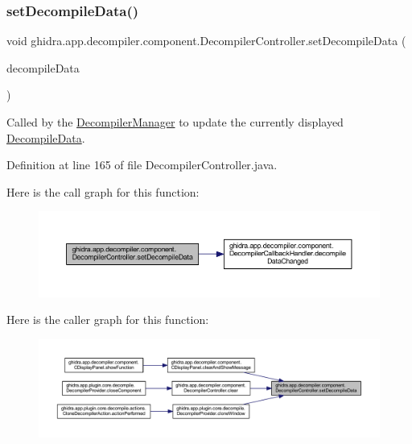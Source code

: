 \subsubsection{\texorpdfstring{setDecompileData()}{setDecompileData()}}
{\footnotesize\ttfamily void ghidra.\+app.\+decompiler.\+component.\+Decompiler\+Controller.\+set\+Decompile\+Data (\begin{DoxyParamCaption}\item[{\mbox{\hyperlink{classghidra_1_1app_1_1decompiler_1_1component_1_1_decompile_data}{Decompile\+Data}}}]{decompile\+Data }\end{DoxyParamCaption})\hspace{0.3cm}{\ttfamily [inline]}}

Called by the \mbox{\hyperlink{classghidra_1_1app_1_1decompiler_1_1component_1_1_decompiler_manager}{Decompiler\+Manager}} to update the currently displayed \mbox{\hyperlink{classghidra_1_1app_1_1decompiler_1_1component_1_1_decompile_data}{Decompile\+Data}}. 

Definition at line 165 of file Decompiler\+Controller.\+java.

Here is the call graph for this function\+:
\nopagebreak
\begin{figure}[H]
\begin{center}
\leavevmode
\includegraphics[width=350pt]{classghidra_1_1app_1_1decompiler_1_1component_1_1_decompiler_controller_a356099cd8c037d53eb60317815d7586a_cgraph}
\end{center}
\end{figure}
Here is the caller graph for this function\+:
\nopagebreak
\begin{figure}[H]
\begin{center}
\leavevmode
\includegraphics[width=350pt]{classghidra_1_1app_1_1decompiler_1_1component_1_1_decompiler_controller_a356099cd8c037d53eb60317815d7586a_icgraph}
\end{center}
\end{figure}
\mbox{\label{classghidra_1_1app_1_1decompiler_1_1component_1_1_decompiler_controller_a2c2f9e954a06f788a8571cf836f89f46}} 
